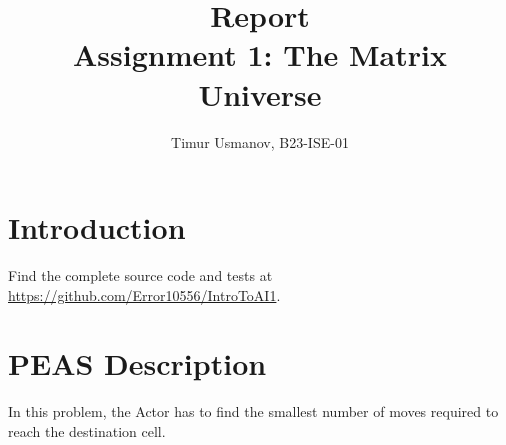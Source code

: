 \documentclass[10pt]{article}
\begin{document}
\title{Report\\Assignment 1: The Matrix Universe}
\author{Timur Usmanov, B23-ISE-01}
\maketitle

\section*{Introduction}
Find the complete source code and tests at \url{https://github.com/Error10556/IntroToAI1}.

\section{PEAS Description}

In this problem, the Actor has to find the smallest number of moves required to reach the destination cell.
\end{document}
